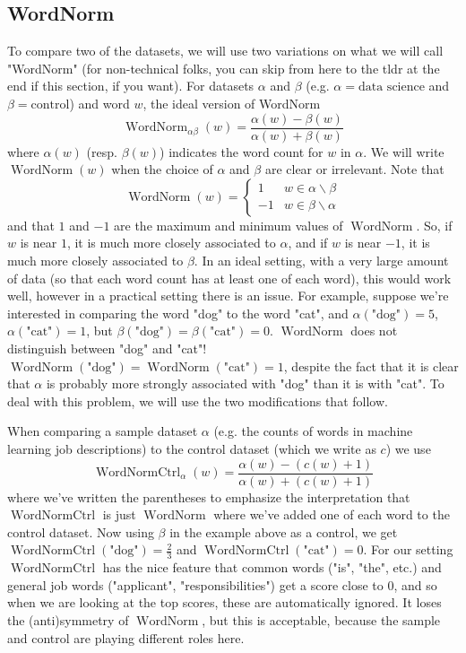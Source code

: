 \documentclass[12pt]{article}
\DeclareMathOperator{\WN}{WordNorm}
\DeclareMathOperator{\WNt}{WordNormCtrl}
\begin{document}
\subsection{WordNorm} To compare two of the datasets, we will use two variations on what we will call "WordNorm" (for non-technical folks, you can skip from here to the tldr at the end if this section, if you want). For datasets $\alpha$ and $\beta$ (e.g. $\alpha = \text{data science}$ and $\beta = \text{control}$) and word $w$, the ideal version of WordNorm
\begin{equation} \label{eqn:WordNorm}
 \WN_{\alpha\beta}(w) = \frac{\alpha(w)-\beta(w)}{\alpha(w)+\beta(w)}
\end{equation}
where $\alpha(w)$ (resp. $\beta(w)$) indicates the word count for $w$ in $\alpha$. We will write $\WN(w)$ when the choice of $\alpha$ and $\beta$ are clear or irrelevant. Note that 
\[
 \WN(w) = \begin{cases} 1 & w \in \alpha \smallsetminus \beta \\ -1 & w \in \beta \smallsetminus \alpha \end{cases}
\]
and that $1$ and $-1$ are the maximum and minimum values of $\WN$. So, if $w$ is near $1$, it is much more closely associated to $\alpha$, and if $w$ is near $-1$, it is much more closely associated to $\beta$. In an ideal setting, with a very large amount of data (so that each word count has at least one of each word), this would work well, however in a practical setting there is an issue. For example, suppose we're interested in comparing the word "dog" to the word "cat", and $\alpha(\text{"dog"}) = 5$, $\alpha(\text{"cat"}) = 1$, but $\beta(\text{"dog"})=\beta(\text{"cat"})=0$. $\WN$ does not distinguish between "dog" and "cat"! $\WN(\text{"dog"})=\WN(\text{"cat"}) = 1$, despite the fact that it is clear that $\alpha$ is probably more strongly associated with "dog" than it is with "cat". To deal with this problem, we will use the two modifications that follow.

When comparing a sample dataset $\alpha$ (e.g. the counts of words in machine learning job descriptions) to the control dataset (which we write as $c$) we use
\begin{equation} \label{eqn:WordNormCtrl}
 \WNt_\alpha(w) = \frac{\alpha(w) - (c(w)+1)}{\alpha(w) + (c(w) + 1)}
\end{equation}
where we've written the parentheses to emphasize the interpretation that $\WNt$ is just $\WN$ where we've added one of each word to the control dataset. Now using $\beta$ in the example above as a control, we get $\WNt(\text{"dog"})=\frac{2}{3}$ and $\WNt(\text{"cat"})=0$. For our setting $\WNt$ has the nice feature that common words ("is", "the", etc.) and general job words ("applicant", "responsibilities") get a score close to $0$, and so when we are looking at the top scores, these are automatically ignored. It loses the (anti)symmetry of $\WN$, but this is acceptable, because the sample and control are playing different roles here.
\end{document}
